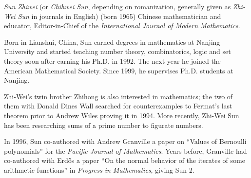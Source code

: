 \documentclass[12pt]{article}
\begin{document}

\emph{Sun Zhiwei} (or \emph{Chihwei Sun}, depending on romanization, generally given as \emph{Zhi-Wei Sun} in journals in English) (born 1965) Chinese mathematician and educator, Editor-in-Chief of the {\it International Journal of Modern Mathematics}.

Born in Lianshui, China, Sun earned degrees in mathematics at Nanjing University and started teaching number theory, combinatorics, logic and set theory soon after earning his Ph.D. in 1992. The next year he joined the American Mathematical Society. Since 1999, he supervises Ph.D. students at Nanjing.

Zhi-Wei's twin brother Zhihong is also interested in mathematics; the two of them with Donald Dines Wall searched for counterexamples to Fermat's last theorem prior to Andrew Wiles proving it in 1994. More recently, Zhi-Wei Sun has been researching sums of a prime number to figurate numbers.

In 1996, Sun co-authored with Andrew Granville a paper on ``Values of Bernoulli polynomials'' for the {\it Pacific Journal of Mathematics}. Years before, Granville had co-authored with Erd\H{o}s a paper ``On the normal behavior of the iterates of some arithmetic functions'' in {\it Progress in Mathematics}, giving Sun  2.
\end{document}
